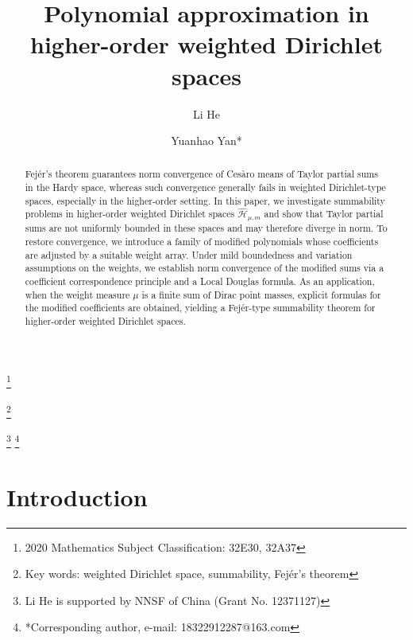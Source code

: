 \documentclass[12pt,reqno]{amsart}
\begin{document}
\title[ Polynomial approximation in higher-order weighted Dirichlet spaces]
	{Polynomial approximation in higher-order weighted Dirichlet spaces}
	
	
	\author{Li He}
	\address{Li He: School of Mathematics and Information Science, Guangzhou University, Guangzhou 510006, China.}
	
	\author{Yuanhao Yan*}
	\address{Yuanhao Yan: School of Mathematics and Information Science, Guangzhou University, Guangzhou 510006, China.}
	
	
	\thanks{2020 Mathematics Subject Classification: 32E30, 32A37}
	
	
	\thanks{Key words: weighted Dirichlet space,  summability, Fej\'er's theorem}
	
	
	
	\thanks{Li He is supported by NNSF of China (Grant No. 12371127)}
    \thanks{*Corresponding author, e-mail: 18322912287@163.com}
	

\begin{abstract}


Fej\'er's theorem guarantees norm convergence of Ces\`aro means of Taylor partial sums in the Hardy space, whereas such convergence generally fails in weighted Dirichlet-type spaces, especially in the higher-order setting.
In this paper, we investigate summability problems in higher-order weighted Dirichlet spaces $\widehat{\mathcal{H}}_{\mu,m}$ and show that Taylor partial sums are not uniformly bounded in these spaces and may therefore diverge in norm. To restore convergence, we introduce a family of modified polynomials whose coefficients are adjusted by a suitable weight array.
Under mild boundedness and variation assumptions on the weights, we establish norm convergence of the modified sums via a coefficient correspondence principle and a Local Douglas formula.
As an application, when the weight measure $\mu$ is a finite sum of Dirac point masses, explicit formulas for the modified coefficients are obtained, yielding a Fej\'er-type summability theorem for higher-order weighted Dirichlet spaces.


\end{abstract}

\maketitle
	\setcounter{section}{0}
\section{Introduction}
\end{document}
